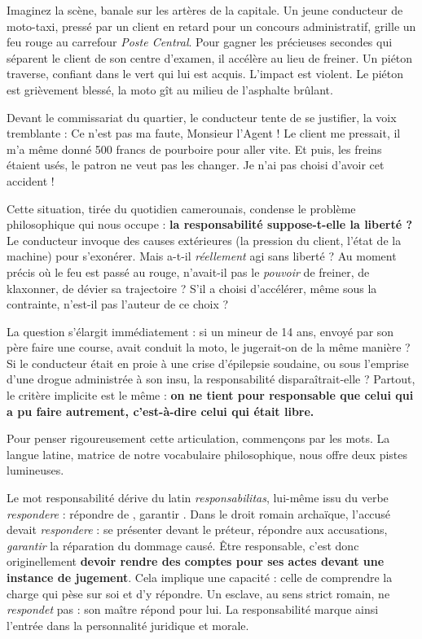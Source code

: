 \documentclass[11pt]{article}
\newcommand{\cle}[1]{{\popxbold\color{popdark}#1}}
\newcounter{popsec}
\newcounter{popsub}
\newcommand{\courssub}[1]{%
  \stepcounter{popsub}%
  \par\vspace{9pt}\noindent{\popxbold\fontsize{11.5}{13}\selectfont\color{popink}{\color{poporange}\thepopsec.\thepopsub}\hspace{6pt}#1}\par\nopagebreak\vspace{4pt}
}
\begin{document}
Imaginez la scène, banale sur les artères de la capitale. Un jeune conducteur de moto-taxi, pressé par un client en retard pour un concours administratif, grille un feu rouge au carrefour \emph{Poste Central}. Pour gagner les précieuses secondes qui séparent le client de son centre d'examen, il accélère au lieu de freiner. Un piéton traverse, confiant dans le vert qui lui est acquis. L'impact est violent. Le piéton est grièvement blessé, la moto gît au milieu de l'asphalte brûlant.

Devant le commissariat du quartier, le conducteur tente de se justifier, la voix tremblante : \og Ce n'est pas ma faute, Monsieur l'Agent ! Le client me pressait, il m'a même donné 500 francs de pourboire pour aller vite. Et puis, les freins étaient usés, le patron ne veut pas les changer. Je n'ai pas choisi d'avoir cet accident ! \fg{}

Cette situation, tirée du quotidien camerounais, condense le problème philosophique qui nous occupe : \textbf{la responsabilité suppose-t-elle la liberté ?} Le conducteur invoque des causes extérieures (la pression du client, l'état de la machine) pour s'exonérer. Mais a-t-il \emph{réellement} agi sans liberté ? Au moment précis où le feu est passé au rouge, n'avait-il pas le \emph{pouvoir} de freiner, de klaxonner, de dévier sa trajectoire ? S'il a choisi d'accélérer, même sous la contrainte, n'est-il pas l'auteur de ce choix ?

La question s'élargit immédiatement : si un mineur de 14 ans, envoyé par son père faire une course, avait conduit la moto, le jugerait-on de la même manière ? Si le conducteur était en proie à une crise d'épilepsie soudaine, ou sous l'emprise d'une drogue administrée à son insu, la responsabilité disparaîtrait-elle ? Partout, le critère implicite est le même : \textbf{on ne tient pour responsable que celui qui a pu faire autrement, c'est-à-dire celui qui était libre.}

\courssub{Étymologie et sens premier : de l'esclave au citoyen}

Pour penser rigoureusement cette articulation, commençons par les mots. La langue latine, matrice de notre vocabulaire philosophique, nous offre deux pistes lumineuses.

\begin{savaistu}
Le mot \cle{responsabilité} dérive du latin \emph{responsabilitas}, lui-même issu du verbe \emph{respondere} : \og répondre de \fg{}, \og garantir \fg{}. Dans le droit romain archaïque, l'accusé devait \emph{respondere} : se présenter devant le préteur, répondre aux accusations, \emph{garantir} la réparation du dommage causé. Être responsable, c'est donc originellement \textbf{devoir rendre des comptes pour ses actes devant une instance de jugement}. Cela implique une capacité : celle de comprendre la charge qui pèse sur soi et d'y répondre. Un esclave, au sens strict romain, ne \emph{respondet} pas : son maître répond pour lui. La responsabilité marque ainsi l'entrée dans la personnalité juridique et morale.
\end{savaistu}
\end{document}
